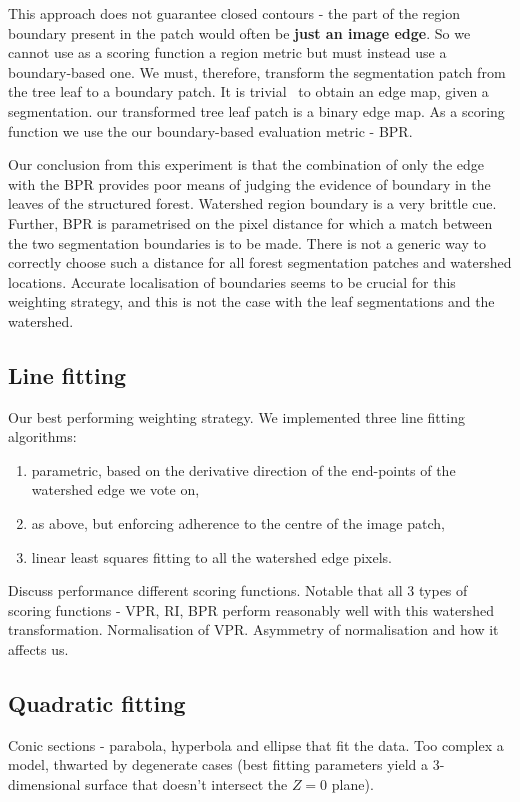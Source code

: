 This approach does not guarantee closed contours - the part of the region boundary present in the patch would often be \textbf{just an image edge}. So we cannot use as a scoring function a region metric but must instead use a boundary-based one. We must, therefore, transform the segmentation patch from the tree leaf to a boundary patch. It is trivial~\cite{Arbelaez11} to obtain an edge map, given a segmentation. our transformed tree leaf patch is a binary edge map. As a scoring function we use the our boundary-based evaluation metric - BPR.

Our conclusion from this experiment is that the combination of only the edge with the BPR provides poor means of judging the evidence of boundary in the leaves of the structured forest. Watershed region boundary is a very brittle cue. Further, BPR is parametrised on the pixel distance for which a match between the two segmentation boundaries is to be made. There is not a generic way to correctly choose such a distance for all forest segmentation patches and watershed locations. Accurate localisation of boundaries seems to be crucial for this weighting strategy, and this is not the case with the leaf segmentations and the watershed.

\subsection*{Line fitting}
Our best performing weighting strategy. We implemented three line fitting algorithms:
\begin{enumerate}
  \item parametric, based on the derivative direction of the end-points of the watershed edge we vote on,
  \item as above, but enforcing adherence to the centre of the image patch,
  \item linear least squares fitting to all the watershed edge pixels.
\end{enumerate}

Discuss performance \wrt different scoring functions. Notable that all 3 types of scoring functions - VPR, RI, BPR perform reasonably well with this watershed transformation. Normalisation of VPR. Asymmetry of normalisation and how it affects us.

\subsection*{Quadratic fitting} %
Conic sections - parabola, hyperbola and ellipse that fit the data. Too complex a model, thwarted by degenerate cases (best fitting parameters yield a 3-dimensional surface that doesn't intersect the $Z=0$ plane).


